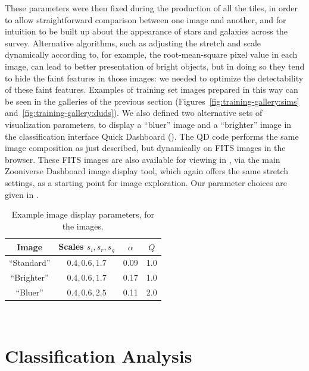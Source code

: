 \documentclass[useAMS,usenatbib,a4paper]{mn2e}
\begin{document}
These parameters were then fixed during the production of all the tiles, in
order to allow straightforward comparison between one image and another, and
for intuition to be built up about the appearance of stars and galaxies across
the survey. Alternative algorithms, such as adjusting the stretch and scale
dynamically according to, for example, the root-mean-square pixel value in
each image, can lead to better presentation of bright objects, but in doing so
they tend to hide the faint features in those images: we needed to optimize
the detectability of these faint features.   Examples of \cfhtls training set
images prepared in this way can be seen in the galleries of the previous
section (Figures~\ref{fig:training-gallery:sims}
and~\ref{fig:training-gallery:duds}). We also defined two alternative sets of
visualization parameters, to display a ``bluer'' image and a ``brighter''
image in the classification interface Quick Dashboard
(). The QD code performs the same image composition
as just described, but dynamically on FITS images in the browser. These FITS
images are also available for viewing in \Talk, via the main Zooniverse
Dashboard image display tool, which again offers the same stretch settings, as
a starting point for image exploration. Our parameter choices are given in
.

\begin{table}
\begin{center}
\caption{Example \humvi image display parameters, for the \cfhtls images.}
\label{tab:data:humvi}
\begin{tabular}{cccc}
  \hline
  \hline {Image} & Scales ${s_i,s_r,s_g}$ & $\alpha$ & $Q$ \\
  \hline
    ``Standard'' &    ${0.4,0.6,1.7}$     &   0.09   & 1.0 \\
    ``Brighter'' &    ${0.4,0.6,1.7}$     &   0.17   & 1.0 \\
       ``Bluer'' &    ${0.4,0.6,2.5}$     &   0.11   & 2.0 \\
  \hline \hline
\end{tabular}
\medskip\\
\end{center}
\end{table}


\section{Classification Analysis}
\label{sec:swap}
\end{document}
